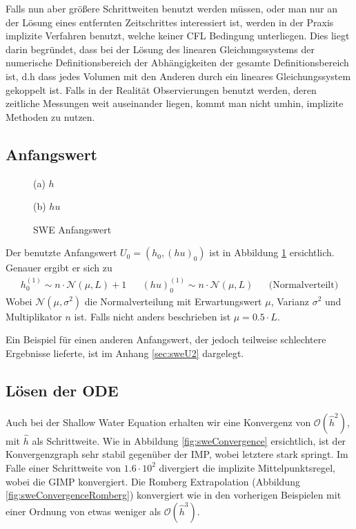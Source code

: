 Falls nun aber größere Schrittweiten benutzt werden müssen, oder man nur an der Lösung eines entfernten Zeitschrittes interessiert ist, werden in der Praxis implizite Verfahren benutzt, welche keiner CFL Bedingung unterliegen. Dies liegt darin begründet, dass bei der Lösung des linearen Gleichungssystems der numerische Definitionsbereich der Abhängigkeiten der gesamte Definitionsbereich ist, d.h dass jedes Volumen mit den Anderen durch ein lineares Gleichungssystem gekoppelt ist. Falls in der Realität Observierungen benutzt werden, deren zeitliche Messungen weit auseinander liegen, kommt man nicht umhin, implizite Methoden zu nutzen.

\subsection{Anfangswert}
\begin{figure}[H]
\footnotesize
\centering
\begin{minipage}[b]{0.49\linewidth}

\caption*{(a) $h$}
\end{minipage}
\begin{minipage}[b]{0.49\linewidth}

\caption*{(b) $hu$}
\end{minipage}
\caption{SWE Anfangswert}
\label{fig:sweInitialValues}
\end{figure}
Der benutzte Anfangswert $U_0 = (h_0,(hu)_0)$ ist in Abbildung \ref{fig:sweInitialValues} ersichtlich. Genauer ergibt er sich zu
\[
\begin{aligned}
 h_0^{(1)} \sim n\cdot\mathcal N(\mu,L) + 1 &&(hu)_0^{(1)}\sim n\cdot\mathcal N(\mu,L) && \text{(Normalverteilt)}
\end{aligned}
\]
Wobei $\mathcal N(\mu, \sigma^2)$ die Normalverteilung mit Erwartungswert $\mu$, Varianz $\sigma^2$ und Multiplikator $n$ ist. Falls nicht anders beschrieben ist $\mu = 0.5\cdot L$.

Ein Beispiel für einen anderen Anfangswert, der jedoch teilweise schlechtere Ergebnisse lieferte, ist im Anhang \ref{sec:sweU2} dargelegt.
\subsection{Lösen der ODE}
Auch bei der Shallow Water Equation erhalten wir eine Konvergenz von $\mathcal O(\hat h^2)$, mit $\hat h$ als Schrittweite. Wie in Abbildung \ref{fig:sweConvergence} ersichtlich, ist der Konvergenzgraph sehr stabil gegenüber der IMP, wobei letztere stark springt.
Im Falle einer Schrittweite von $1.6\cdot 10^2$ divergiert die implizite Mittelpunktsregel, wobei die GIMP konvergiert. 
Die Romberg Extrapolation (Abbildung \ref{fig:sweConvergenceRomberg}) konvergiert wie in den vorherigen Beispielen mit einer Ordnung von etwas weniger als $\mathcal O(\hat h^3)$. 

